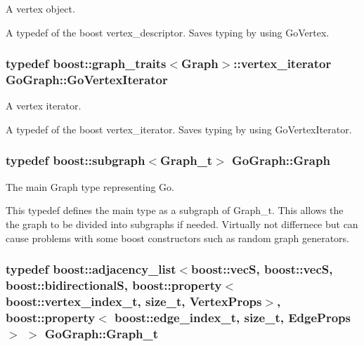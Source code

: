 A vertex object. 

A typedef of the boost vertex\+\_\+descriptor. Saves typing by using Go\+Vertex. 
\subsubsection[{\texorpdfstring{Go\+Vertex\+Iterator}{GoVertexIterator}}]{\setlength{\rightskip}{0pt plus 5cm}typedef boost\+::graph\+\_\+traits$<${\bf Graph}$>$\+::vertex\+\_\+iterator {\bf Go\+Graph\+::\+Go\+Vertex\+Iterator}}\hypertarget{classGoGraph_a1e893efb01d71292881b2fa45c771b79}{}\label{classGoGraph_a1e893efb01d71292881b2fa45c771b79}


A vertex iterator. 

A typedef of the boost vertex\+\_\+iterator. Saves typing by using Go\+Vertex\+Iterator. 
\subsubsection[{\texorpdfstring{Graph}{Graph}}]{\setlength{\rightskip}{0pt plus 5cm}typedef boost\+::subgraph$<${\bf Graph\+\_\+t}$>$ {\bf Go\+Graph\+::\+Graph}}\hypertarget{classGoGraph_aae4ae00d4785dcee01a514feb768f380}{}\label{classGoGraph_aae4ae00d4785dcee01a514feb768f380}


The main Graph type representing Go. 

This typedef defines the main type as a subgraph of Graph\+\_\+t. This allows the the graph to be divided into subgraphs if needed. Virtually not differnece but can cause problems with some boost constructors such as random graph generators. 
\subsubsection[{\texorpdfstring{Graph\+\_\+t}{Graph_t}}]{\setlength{\rightskip}{0pt plus 5cm}typedef boost\+::adjacency\+\_\+list$<$boost\+::vecS, boost\+::vecS, boost\+::bidirectionalS, boost\+::property$<$ boost\+::vertex\+\_\+index\+\_\+t, size\+\_\+t, {\bf Vertex\+Props}$>$, boost\+::property$<$ boost\+::edge\+\_\+index\+\_\+t, size\+\_\+t, {\bf Edge\+Props}$>$ $>$ {\bf Go\+Graph\+::\+Graph\+\_\+t}}\hypertarget{classGoGraph_a2586bfc8740625d2d615662ac86f10f9}{}\label{classGoGraph_a2586bfc8740625d2d615662ac86f10f9}


